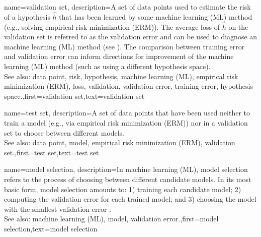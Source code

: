 {name={validation set},
  description={A set of data points used to estimate 
  	the risk of a hypothesis $\hat{h}$ that has been learned by some 
  	machine learning (ML) method (e.g., solving empirical risk minimization (ERM)). The average loss of $\hat{h}$ 
  	on the validation set is referred to as the validation error and can be used to diagnose an 
  	machine learning (ML) method (see \cite[Sec. 6.6]{MLBasics}). The comparison between training error 
  	and validation error can inform directions for improvement of the machine learning (ML) method (such as 
  	using a different hypothesis space).
			\\
		See also: data point, risk, hypothesis, machine learning (ML), empirical risk minimization (ERM), loss, validation, validation error, training error, hypothesis space.},first={validation set},text={validation set}  
}

{name={test set},
	description={A set of data points that have  
		been used neither to train a model (e.g., via empirical risk minimization (ERM)) nor in a validation set 
		to choose between different models.
				\\
		See also: data point, model, empirical risk minimization (ERM), validation set.},first={test set},text={test set}  
}


{name={model selection},
	description={In machine learning (ML), model selection refers to the 
		process of choosing between different candidate models. In its most 
		basic form, model selection amounts to: 1) training each candidate model; 
		2) computing the validation error for each trained model; and 3) choosing the model 
		with the smallest validation error \cite[Ch. 6]{MLBasics}. 
				\\
		See also: machine learning (ML), model, validation error.},first={model selection},text={model selection}  
}






